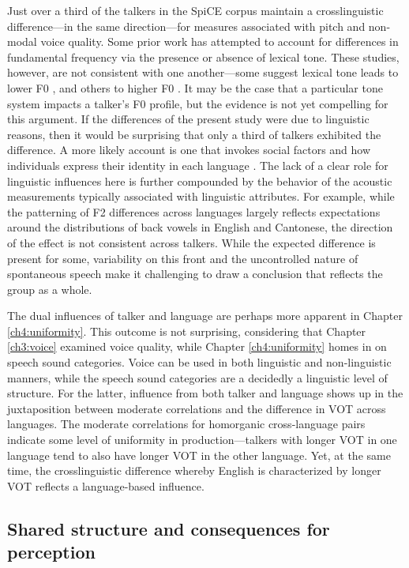Just over a third of the talkers in the SpiCE corpus maintain a crosslinguistic difference---in the same direction---for measures associated with pitch and non-modal voice quality. Some prior work has attempted to account for differences in fundamental frequency via the presence or absence of lexical tone. These studies, however, are not consistent with one another---some suggest lexical tone leads to lower F0 \citep{ng_2012_ltas}, and others to higher F0 \citep{lee_2017_bilingual, keating_2012_f0}. It may be the case that a particular tone system impacts a talker's F0 profile, but the evidence is not yet compelling for this argument. If the differences of the present study were due to linguistic reasons, then it would be surprising that only a third of talkers exhibited the difference. A more likely account is one that invokes social factors and how individuals express their identity in each language \citep{loveday_1981_pitch, voigt_2016_between}. The lack of a clear role for linguistic influences here is further compounded by the behavior of the acoustic measurements typically associated with linguistic attributes. For example, while the patterning of F2 differences across languages largely reflects expectations around the distributions of back vowels in English and Cantonese, the direction of the effect is not consistent across talkers. While the expected difference is present for some, variability on this front and the uncontrolled nature of spontaneous speech make it challenging to draw a conclusion that reflects the group as a whole.

The dual influences of talker and language are perhaps more apparent in Chapter \ref{ch4:uniformity}. This outcome is not surprising, considering that Chapter \ref{ch3:voice} examined voice quality, while Chapter \ref{ch4:uniformity} homes in on speech sound categories. Voice can be used in both linguistic and non-linguistic manners, while the speech sound categories are a decidedly a linguistic level of structure. For the latter, influence from both talker and language shows up in the juxtaposition between moderate correlations and the difference in VOT across languages. The moderate correlations for homorganic cross-language pairs indicate some level of uniformity in production---talkers with longer VOT in one language tend to also have longer VOT in the other language. Yet, at the same time, the crosslinguistic difference whereby English is characterized by longer VOT reflects a language-based influence. 

\subsection{Shared structure and consequences for perception}

